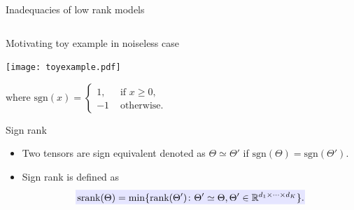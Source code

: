 \documentclass[10pt, mathserif]{beamer} %
\theoremstyle{definition}
\theoremstyle{plain}
\begin{document}
\begin{frame}{Inadequacies of low rank models}
\begin{itemize}
{\begin{columns}
\begin{column}{0.5\textwidth}
\end{column}
\end{columns}
    
  }
 \end{itemize}
\end{frame}

\begin{frame}{Motivating toy example in noiseless case}
    \begin{center}
    \texttt{[image: toyexample.pdf]}
    \end{center}
{\footnotesize where $\text{sgn}(x) = \begin{cases}1,&\text{ if } x\geq 0,\\-1 &\text{ otherwise.}\end{cases}$}
\end{frame}



\begin{frame}{Sign rank}
\begin{itemize}
    \item  Two tensors are sign equivalent denoted as $\Theta \simeq \Theta'$ if $\text{sgn}(\Theta) = \text{sgn}(\Theta')$.

    \item Sign rank is defined as
    \begin{align}
    \rlap{\textcolor{blue!10}{\rule[-\dp\strutbox]{235pt}{\baselineskip}}}\,\text{srank}(\Theta) = \min\{\text{rank}(\Theta')\colon \Theta'\simeq \Theta, \Theta'\in\mathbb{R}^{d_1\times\cdots\times d_K}\}.
    \end{align}
\end{itemize}


\end{frame}
\end{document}
